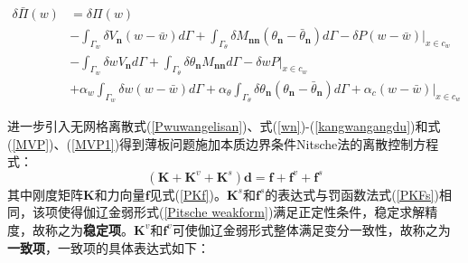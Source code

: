 \begin{equation}\label{Pitsche weakform}
\begin{split}
    \delta\bar{\Pi}(w)&=\delta\Pi(w)\\
 &-\int_{\Gamma_w}\delta V_{\pmb n}(w-\bar{w})d\Gamma+\int_{\Gamma_{\theta}}\delta M_{\pmb{nn}}(\theta_{\pmb n}-\bar{\theta}_{\pmb n})d\Gamma-\delta P(w-\bar{w})\vert_{x\in c_w}\\
 &-\int_{\Gamma_w}\delta wV_{\pmb n}d\Gamma+\int_{\Gamma_{\theta}}\delta\theta_{\pmb n}M_{\pmb{nn}}d\Gamma-\delta wP\vert_{x\in c_w}\\
 &+\alpha_w\int_{\Gamma_w}\delta w(w-\bar{w})d\Gamma+\alpha_\theta\int_{\Gamma_{\theta}}\delta\theta_{\pmb n}(\theta_{\pmb n}-\bar{\theta}_{\pmb n})d\Gamma+\alpha_c(w-\bar{w})\vert_{x\in c_w}
\end{split}
\end{equation}\par
进一步引入无网格离散式(\ref{Pwuwangelisan})、式(\ref{wn})-(\ref{kangwangangdu})和式(\ref{MVP})、(\ref{MVP1})得到薄板问题施加本质边界条件Nitsche法的离散控制方程式：
\begin{equation}
    (\pmb{K}+\pmb{K}^v+\pmb{K}^s)\pmb{d}=\pmb{f}+\pmb{f}^v+\pmb{f}^s
\end{equation}
其中刚度矩阵$\pmb{K}$和力向量$\pmb{f}$见式(\ref{PKf})。$\pmb{K}^s$和$\pmb{f}^s$的表达式与罚函数法式(\ref{PKFs})相同，该项使得伽辽金弱形式(\ref{Pitsche weakform})满足正定性条件，稳定求解精度，故称之为\textbf{稳定项}。$\pmb{K}^v$和$\pmb{f}^v$可使伽辽金弱形式整体满足变分一致性，故称之为\textbf{一致项}，一致项的具体表达式如下：
